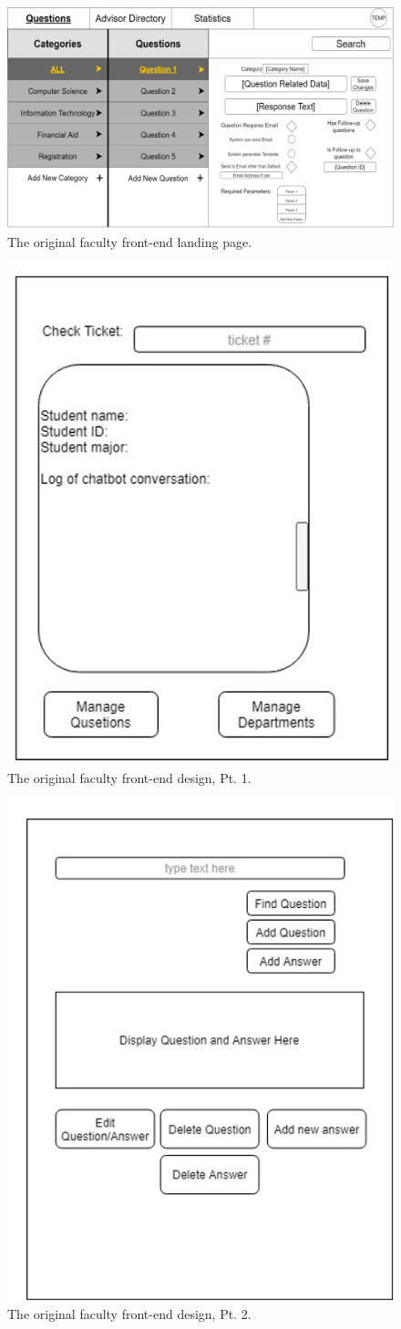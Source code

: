 \documentclass[titlepage, 12pt]{article}
\begin{document}
\begin{figure}[p]
    \centering\includegraphics[width=1\linewidth]{images/original-landing-page.png}
    \caption{The original faculty front-end landing page.}
\end{figure}

\begin{figure}[p]
    \centering\includegraphics[width=0.5\linewidth]{images/original-faculty-front-1.png}
    \caption{The original faculty front-end design, Pt. 1.}
\end{figure}

\begin{figure}[p]
    \centering\includegraphics[width=0.5\linewidth]{images/original-faculty-front-2.png}
    \caption{The original faculty front-end design, Pt. 2.}
\end{figure}
\end{document}
